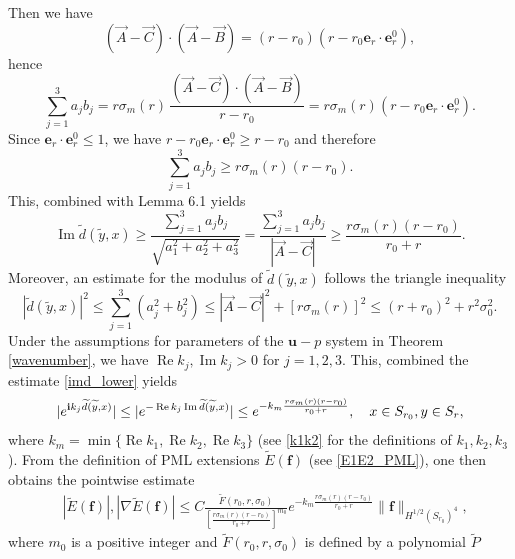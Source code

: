 \documentclass[11pt]{article}
\newcommand{\sig}{\sigma}
\newcommand{\wid}{\widetilde}
\newcommand{\bs}{\boldsymbol}
\providecommand{\Rp}{\operatorname{Re}}%
\providecommand{\Ip}{\operatorname{Im}}%
\begin{document}
Then we have         
\begin{equation*}
(\vec{A}-\vec{C})\cdot(\vec{A}-\vec{B}) = (r-r_0)(r - r_0\bs{e}_r\cdot\bs{e}_r^0),
\end{equation*}
hence
\begin{equation*}
\sum_{j=1}^3 a_j b_j = r\sig_m(r)\,\frac{(\vec{A}-\vec{C})\cdot(\vec{A}-\vec{B})}{r-r_0}
= r\sig_m(r)(r - r_0\bs{e}_r\cdot\bs{e}_r^0).
\end{equation*}
Since $\bs{e}_r\cdot\bs{e}_r^0\le 1$, we have $r - r_0\bs{e}_r\cdot\bs{e}_r^0\ge r-r_0$ 
and therefore
\begin{equation*}
\sum_{j=1}^3 a_j b_j \ge r\sig_m(r)(r-r_0).
\end{equation*}
This, combined with Lemma 6.1 yields
\begin{equation}\label{imd_lower}
\Ip\wid{d}(\wid{y},x)
\ge \frac{\sum_{j=1}^3 a_j b_j}{\sqrt{a_1^2+a_2^2+a_3^2}}
= \frac{\sum_{j=1}^3 a_j b_j}{|\vec{A}-\vec{C}|}\geq\frac{r\sig_m(r)(r-r_0)}{r_0+r}.
\end{equation}
Moreover, an estimate for the modulus of $\wid{d}(\wid{y},x)$ follows the triangle inequality
\begin{equation*}
|\wid{d}(\wid{y},x)|^2\le \sum_{j=1}^3(a_j^2+b_j^2)
\le |\vec{A}-\vec{C}|^2 + [r\sig_m(r)]^2 \le (r+r_0)^2 + r^2\sig_0^2.
\end{equation*}
Under the assumptions for parameters of the $\mathbf{u}-p$ system in Theorem \ref{wavenumber}, 
we have $\Rp k_j,\Ip k_j>0$ for $j=1,2,3$. This, combined the estimate \eqref{imd_lower} yields
$$ \begin{aligned}
\lvert e^{{\bf i}k_j\wid{d}(\wid{y},x)}\rvert
\leq \lvert e^{-\Rp k_j\Ip\wid{d}(\wid{y},x)}\rvert
\leq e^{-k_m\frac{r\sig_m(r)(r-r_0)}{r_0+r}},\quad x\in S_{r_0},y\in S_{r},
\end{aligned}$$
where $k_{m}=\min\{\Rp k_1,\Rp k_2,\Rp k_3\}$ (see \eqref{k1k2} for the definitions of $k_1,k_2,k_3$).
From the definition of PML extensions $\wid{E}(\bs{f})$ (see \eqref{E1E2_PML}), one then obtains 
the pointwise estimate
\begin{equation}\label{keypmlextensionpestimate}
\begin{aligned}
&|\wid{E}(\bs{f})|, |\nabla \wid{E}(\bs{f})|
\le C\frac{\wid{F}(r_0,r,\sig_0)}{\left[\frac{r\sig_m(r)(r-r_0)}{r_0+r}\right]^{m_0}}
e^{-k_{m}\frac{r\sig_m(r)(r-r_0)}{r_0+r}} \|\bs{f}\|_{H^{1/2}(S_{r_0})^4},
\end{aligned}
\end{equation}
where $m_0$ is a positive integer and
$\wid{F}(r_0,r,\sig_0)$ is defined by a polynomial $\wid{P}$
\end{document}
